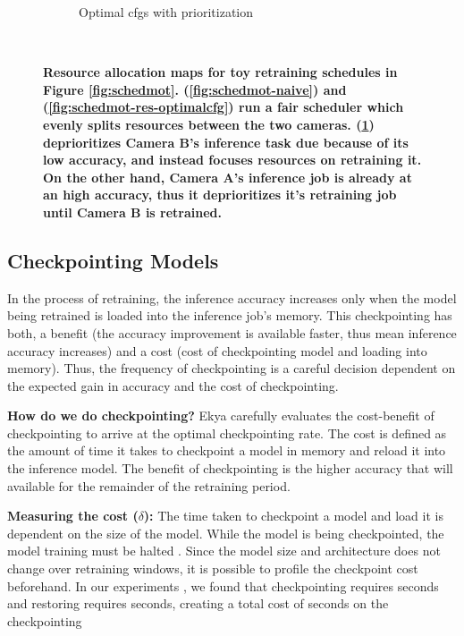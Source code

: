 \begin{figure}[t]
\begin{subfigure}[t]{0.5\columnwidth}
    \caption{\small Optimal cfgs with prioritization}
    \label{fig:schedmot-res-prioritization}
  \end{subfigure}
  ~~
  \caption{\bf\small Resource allocation maps for toy retraining schedules in Figure \ref{fig:schedmot}. (\ref{fig:schedmot-naive}) and (\ref{fig:schedmot-res-optimalcfg}) run a fair scheduler which evenly splits resources between the two cameras. (\ref{fig:schedmot-res-prioritization}) deprioritizes Camera B's inference task due because of its low accuracy, and instead focuses resources on retraining it. On the other hand, Camera A's inference job is already at an high accuracy, thus it deprioritizes it's retraining job until Camera B is retrained. }
  \label{fig:schedmot-res}
\end{figure}


\subsection{Checkpointing Models}
\label{subsec:checkpoint}
In the process of retraining, the inference accuracy increases only when the model being retrained is loaded into the inference job's memory. This checkpointing has both, a benefit (the accuracy improvement is available faster, thus mean inference accuracy increases) and a cost (cost of checkpointing model and loading into memory). Thus, the frequency of checkpointing is a careful decision dependent on the expected gain in accuracy and the cost of checkpointing.  

\textbf{How do we do checkpointing?} Ekya carefully evaluates the cost-benefit of checkpointing to arrive at the optimal checkpointing rate. The cost is defined as the amount of time it takes to checkpoint a model in memory and reload it into the inference model. The benefit of checkpointing is the higher accuracy that will available for the remainder of the retraining period.

\textbf{Measuring the cost ($\delta$): } The time taken to checkpoint a model and load it is dependent on the size of the model. While the model is being checkpointed, the model training must be halted . Since the model size and architecture does not change over retraining windows, it is possible to profile the checkpoint cost beforehand. In our experiments , we found that checkpointing requires  seconds and restoring requires  seconds, creating a total cost of \romilc{$\delta$} seconds on the checkpointing 

